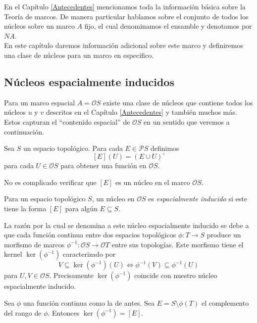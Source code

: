 En el Capítulo \ref{Antecedentes} mencionamos toda la información básica sobre la Teoría de marcos. De manera particular hablamos sobre el conjunto de todos los núcleos sobre un marco $A$ fijo, el cual denominamos el ensamble y denotamos por $NA$.\\

En este capítulo daremos información adicional sobre este marco y definiremos una clase de núcleos para un marco en especifico.

\subsection{Núcleos espacialmente inducidos}

Para un marco espacial $A=\mathcal{O}S$ existe una clase de núcleos que contiene todos los núcleos $u$ y $v$ descritos en el Capítulo \ref{Antecedentes} y también muchos más. Estos capturan el ``contenido espacial'' de $\mathcal{O}S$ en un sentido que veremos a continuación.

\begin{dfn}\label{Definicion5.3.1}
    Sea $S$ un espacio topológico. Para cada $E\in \mathcal{P}S$ definimos 
    \[
    [E](U)=(E\cup U)^\circ
    \]
    para cada $U\in \mathcal{O}S$ para obtener una función en $\mathcal{O}S$.
\end{dfn}

No es complicado verificar que $[E]$ es un núcleo en el marco $\mathcal{O}S$.

\begin{dfn}\label{Definicon5.3.2}
    Para un espacio topológico $S$, un núcleo en $\mathcal{O}S$ es \emph{espacialmente inducido} si este tiene la forma $[E]$ para algún $E\subseteq S$.
\end{dfn}

La razón por la cual se denomina a este núcleo espacialmente inducido se debe a que cada función continua entre dos espacios topológicos $\phi\colon T\to S$ produce un morfismo de marcos $\phi^{-1}\colon \mathcal{O}S \to \mathcal{O}T$ entre sus topologías. Este morfismo tiene el kernel $\ker(\phi^{-1})$ caracterizado por 
\[
V\subseteq \ker(\phi^{-1})(U)\Leftrightarrow \phi^{-1}(V)\subseteq \phi^{-1}(U)
\]
para $U, V\in \mathcal{O}S$. Precisamente $\ker(\phi^{-1})$ coincide con nuestro núcleo espacialmente inducido.

\begin{thm}
    Sea $\phi$ una función continua como la de antes. Sea $E=S\setminus \phi(T)$ el complemento del rango de $\phi$. Entonces $\ker(\phi^{-1})=[E]$.
\end{thm}

